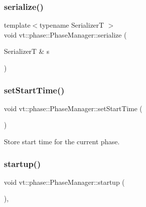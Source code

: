 \subsubsection{\texorpdfstring{serialize()}{serialize()}}
{\footnotesize\ttfamily template$<$typename SerializerT $>$ \\
void vt\+::phase\+::\+Phase\+Manager\+::serialize (\begin{DoxyParamCaption}\item[{SerializerT \&}]{s }\end{DoxyParamCaption})\hspace{0.3cm}{\ttfamily [inline]}}

\mbox{\label{structvt_1_1phase_1_1_phase_manager_a7844c9468a45c9e49d94436f3f565a1f}} 
\subsubsection{\texorpdfstring{set\+Start\+Time()}{setStartTime()}}
{\footnotesize\ttfamily void vt\+::phase\+::\+Phase\+Manager\+::set\+Start\+Time (\begin{DoxyParamCaption}{ }\end{DoxyParamCaption})}



Store start time for the current phase. 

\mbox{\label{structvt_1_1phase_1_1_phase_manager_a541d1f6c7a350fad979911ac60f38025}} 
\subsubsection{\texorpdfstring{startup()}{startup()}}
{\footnotesize\ttfamily void vt\+::phase\+::\+Phase\+Manager\+::startup (\begin{DoxyParamCaption}{ }\end{DoxyParamCaption})\hspace{0.3cm}{\ttfamily [override]}, {\ttfamily [virtual]}}



